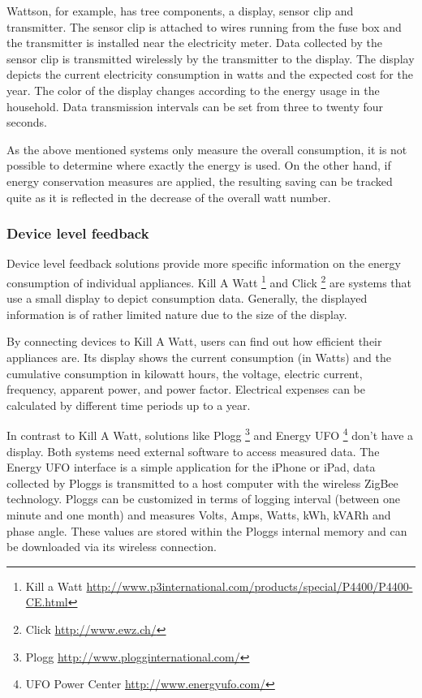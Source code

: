 Wattson, for example, has tree components, a display, sensor clip and transmitter. The sensor clip is attached to wires running from the fuse box and the transmitter is installed near the electricity meter. Data collected by the sensor clip is transmitted wirelessly by the transmitter to the display. The display depicts the current electricity consumption in watts and the expected cost for the year. The color of the display changes according to the energy usage in the household. Data transmission intervals can be set from three to twenty four seconds.

As the above mentioned systems only measure the overall consumption, it is not possible to determine where exactly the energy is used. On the other hand, if energy conservation measures are applied, the resulting saving can be tracked quite as it is reflected in the decrease of the overall watt number.

\subsubsection{Device level feedback}
Device level feedback solutions provide more specific information on the energy consumption of individual appliances. Kill A Watt \footnote{Kill a Watt \url{http://www.p3international.com/products/special/P4400/P4400-CE.html}} and Click \footnote{Click \url{http://www.ewz.ch/}} are systems that use a small display to depict consumption data. Generally, the displayed information is of rather limited nature due to the size of the display.
 
By connecting devices to Kill A Watt, users can find out how efficient their appliances are. Its display shows the current consumption (in Watts) and the cumulative consumption in kilowatt hours, the voltage, electric current, frequency, apparent power, and power factor. Electrical expenses can be calculated by different time periods up to a year. 

In contrast to Kill A Watt, solutions like Plogg \footnote{Plogg \url{http://www.plogginternational.com/}} and Energy UFO \footnote{UFO Power Center \url{http://www.energyufo.com/}} don't have a display. Both systems need external software to access measured data.
The Energy UFO interface is a simple application for the iPhone or iPad, data collected by Ploggs is transmitted to a host computer with the wireless ZigBee technology. Ploggs  can be customized in terms of logging interval (between one minute and one month) and measures Volts, Amps, Watts, kWh, kVARh and phase angle.
These values are stored within the Ploggs internal memory and can be downloaded via its wireless connection.

